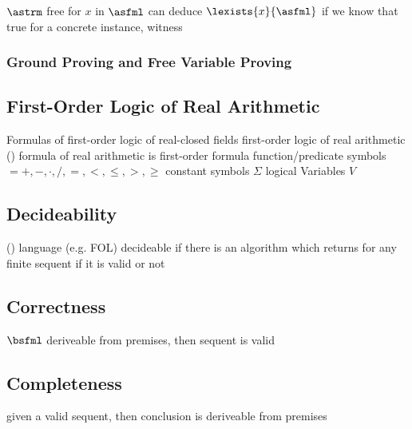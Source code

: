                     $\astrm$ free for $x$ in $\asfml$
                    can deduce $\lexists{x}{\asfml}$ if we know that true for a concrete instance, witness

            \subsubsection{Ground Proving and Free Variable Proving}
                \label{sec:ground-proving-free-variable-proving}



        \subsection{First-Order Logic of Real Arithmetic}
            \label{sec:FOL-R}

            Formulas of first-order logic of real-closed fields
            first-order logic of real arithmetic (\FOLR)
            formula of real arithmetic
            is first-order formula
            function/predicate symbols $ = {+,-,\cdot,/,=,<,\leq,>,\geq}$
            constant symbols $\Sigma$
            logical Variables $V$

        \subsection{Decideability}
            \label{sec:decideability}

            (\cite{Hodges01ClassicalLogic})
            language (e.g. FOL) decideable if there is an algorithm which returns for any finite sequent if it is valid or not

        \subsection{Correctness}
            \label{sec:correctness}

            $\bsfml$ deriveable from premises, then sequent is valid

        \subsection{Completeness}
            \label{sec:completeness}

            given a valid sequent, then conclusion is deriveable from premises

